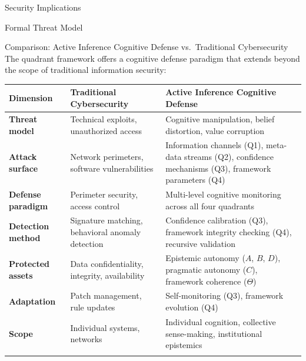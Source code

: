 \documentclass[
  ignorenonframetext,
]{beamer}
\newcounter{none} %
\begin{document}
\begin{frame}{Security Implications}
\begin{block}{Formal Threat Model}
\begin{block}{Comparison: Active Inference Cognitive Defense
vs.~Traditional Cybersecurity}
\protect{}\label{comparison-active-inference-cognitive-defense-vs.-traditional-cybersecurity}
The quadrant framework offers a cognitive defense paradigm that extends
beyond the scope of traditional information security:

{\def\LTcaptype{none} %
\begin{longtable}[]{@{}
  >{\raggedright\arraybackslash}p{}
  >{\raggedright\arraybackslash}p{}
  >{\raggedright\arraybackslash}p{}@{}}
\toprule\noalign{}
\begin{minipage}[b]{\linewidth}\raggedright
Dimension
\end{minipage} & \begin{minipage}[b]{\linewidth}\raggedright
Traditional Cybersecurity
\end{minipage} & \begin{minipage}[b]{\linewidth}\raggedright
Active Inference Cognitive Defense
\end{minipage} \\
\midrule\noalign{}
\endhead
\textbf{Threat model} & Technical exploits, unauthorized access &
Cognitive manipulation, belief distortion, value corruption \\
\textbf{Attack surface} & Network perimeters, software vulnerabilities &
Information channels (Q1), meta-data streams (Q2), confidence mechanisms
(Q3), framework parameters (Q4) \\
\textbf{Defense paradigm} & Perimeter security, access control &
Multi-level cognitive monitoring across all four quadrants \\
\textbf{Detection method} & Signature matching, behavioral anomaly
detection & Confidence calibration (Q3), framework integrity checking
(Q4), recursive validation \\
\textbf{Protected assets} & Data confidentiality, integrity,
availability & Epistemic autonomy (\(A\), \(B\), \(D\)), pragmatic
autonomy (\(C\)), framework coherence (\(\Theta\)) \\
\textbf{Adaptation} & Patch management, rule updates & Self-monitoring
(Q3), framework evolution (Q4) \\
\textbf{Scope} & Individual systems, networks & Individual cognition,
collective sense-making, institutional epistemics \\
\bottomrule\noalign{}
\end{longtable}
}


\end{block}
\end{block}
\end{frame}
\end{document}
